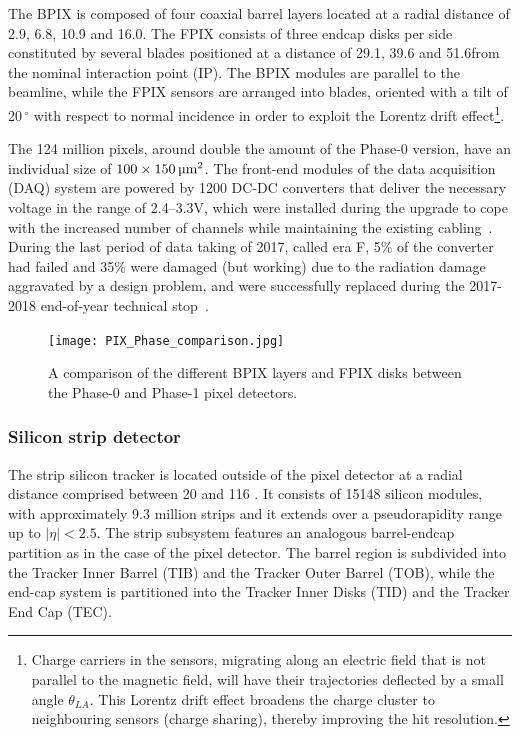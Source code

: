 The BPIX is composed of four coaxial barrel layers located at a radial distance of 2.9, 6.8, 10.9 and 16.0\cm.
The FPIX consists of three endcap disks per side constituted by several blades positioned at a distance of 29.1, 39.6 and 51.6\cm from the nominal interaction point (IP).
The BPIX modules are parallel to the beamline, while the FPIX sensors are arranged into blades, oriented with a tilt of 20$\,^{\circ}$ with respect to normal incidence in order to exploit the Lorentz drift effect\footnote{
Charge carriers in the sensors, migrating along an electric field that is not parallel to the magnetic field, will have their trajectories deflected by a small angle $\theta_{LA}$.
This Lorentz drift effect broadens the charge cluster to neighbouring sensors (charge sharing), thereby improving the hit resolution.
}.

The 124 million pixels, around double the amount of the Phase-0 version, have an individual size of $100 \times 150 \mum^2$.
The front-end modules of the data acquisition (DAQ) system are powered by 1200 DC-DC converters that deliver the necessary voltage in the range of 2.4--3.3\usep V,
which were installed during the upgrade to cope with the increased number of channels while maintaining the existing cabling~\cite{Feld_2015}.
During the last period of data taking of 2017, called era F, 5\usep \% of the converter had failed and 35\usep \% were damaged (but working) due to the radiation damage aggravated by a design problem, and were successfully replaced during the 2017-2018 end-of-year technical stop~\cite{CMS:dcdc-failure-short}.

\begin{figure}[thb]
  \centering
  \texttt{[image: PIX\_Phase\_comparison.jpg]}
  \caption{A comparison of the different BPIX layers and FPIX disks between the Phase-0 and Phase-1 pixel detectors.}
  \label{fig:PIX_Phase_comparison}
\end{figure}

\subsubsection{Silicon strip detector}
The strip silicon tracker is located outside of the pixel detector at a radial distance comprised between 20 and 116 \cm.
It consists of 15148 silicon modules, with approximately 9.3 million strips and it extends over a pseudorapidity range up to $|\eta| < 2.5$.
The strip subsystem features an analogous barrel-endcap partition as in the case of the pixel detector.
The barrel region is subdivided into the Tracker Inner Barrel (TIB) and the Tracker Outer Barrel (TOB),
while the end-cap system is partitioned into the Tracker Inner Disks (TID) and the Tracker End Cap (TEC).

